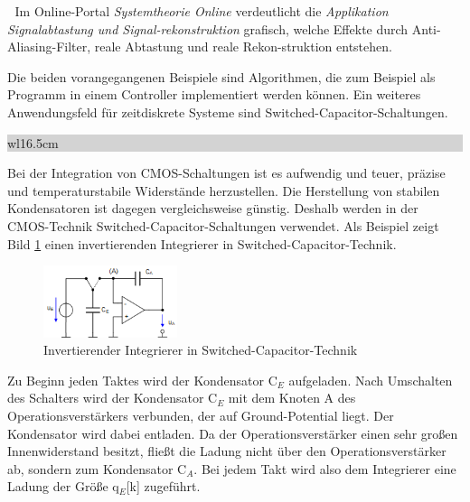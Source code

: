 \textcolor{white}{.}\newline
\noindent Im Online-Portal \textit{Systemtheorie Online} verdeutlicht die \textit{Applikation Signalabtastung und Signal-rekonstruktion} grafisch, welche Effekte durch Anti-Aliasing-Filter, reale Abtastung und reale Rekon-struktion entstehen.\newline   

\noindent Die beiden vorangegangenen Beispiele sind Algorithmen, die zum Beispiel als Programm in einem Controller implementiert werden k\"{o}nnen. Ein weiteres Anwendungsfeld f\"{u}r zeitdiskrete Systeme sind Switched-Capacitor-Schaltungen.\bigskip

\noindent
\colorbox{lightgray}{%
%
\renewcommand\arraystretch{0.6}%
\begin{tabular}{ wl{16.5cm} }
{\selectfont{Beispiel: Switched-Capacitor-Schaltung}}
\end{tabular}%
}\medskip

\noindent Bei der Integration von CMOS-Schaltungen ist es aufwendig und teuer, pr\"{a}zise und temperaturstabile Widerst\"{a}nde herzustellen. Die Herstellung von stabilen Kondensatoren ist dagegen vergleichsweise g\"{u}nstig. Deshalb werden in der CMOS-Technik Switched-Capacitor-Schaltungen verwendet. Als Beispiel zeigt Bild \ref{fig:SC_Filter} einen invertierenden Integrierer in Switched-Capacitor-Technik.

\begin{figure}[H]
  \centerline{\includegraphics[width=0.35\textwidth]{Kapitel4/Bilder/image3.png}}
  \caption{Invertierender Integrierer in Switched-Capacitor-Technik}
  \label{fig:SC_Filter}
\end{figure}

\noindent Zu Beginn jeden Taktes wird der Kondensator C${}_{E}$ aufgeladen. Nach Umschalten des Schalters wird der Kondensator C${}_{E}$ mit dem Knoten A des Operationsverst\"{a}rkers verbunden, der auf Ground-Potential liegt. Der Kondensator wird dabei entladen. Da der Operationsverst\"{a}rker einen sehr gro{\ss}en Innenwiderstand besitzt, flie{\ss}t die Ladung nicht \"{u}ber den Operationsverst\"{a}rker ab, sondern zum Kondensator C${}_{A}$. Bei jedem Takt wird also dem Integrierer eine Ladung der Gr\"{o}{\ss}e q${}_{E}$[k] zugef\"{u}hrt.

